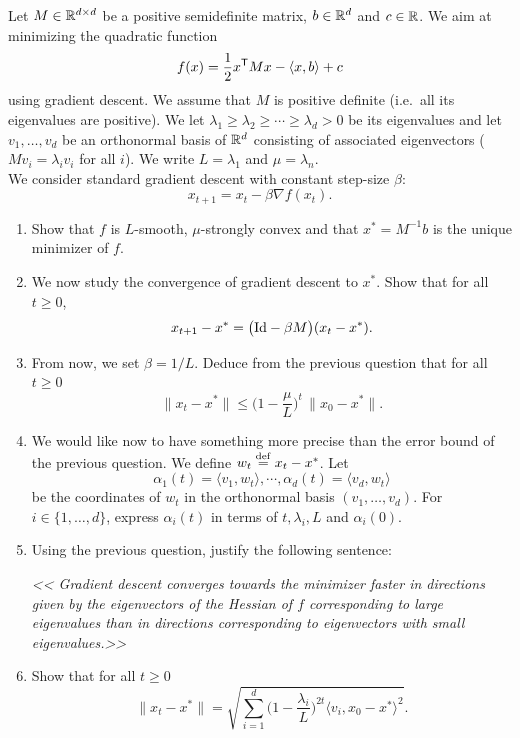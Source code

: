 \documentclass[11pt,nocut]{article}
\begin{document}
\begin{problem}[3 points]\label{p:grad}
	Let $M \in \mathbb{R}^{d \times d}$ be a positive semidefinite matrix, $b \in \mathbb{R}^d$ and $c \in \mathbb{R}$. We aim at minimizing the quadratic function
	$$
	f(x) = \frac{1}{2} x^{{\sf T}} M x - \langle x,b \rangle + c
	$$
	using gradient descent. 
	We assume that $M$ is positive definite (i.e.\ all its eigenvalues are positive).
	We let $\lambda_1 \geq \lambda_2 \geq \cdots \geq \lambda_d >0$ be its eigenvalues and let $v_1, \dots, v_d$ be an orthonormal basis of $\mathbb{R}^d$ consisting of associated eigenvectors ($Mv_i = \lambda_i v_i$ for all $i$).
	We write $L = \lambda_1$ and $\mu = \lambda_n$.
	\\

	We consider standard gradient descent with constant step-size $\beta$:
$$
x_{t+1} = x_t - \beta \nabla f(x_t).
$$
	\begin{enumerate}[label=\normalfont(\textbf{\alph*})]
		\item Show that $f$ is $L$-smooth, $\mu$-strongly convex and that $x^* = M^{-1} b$ is the unique minimizer of $f$.
		\item We now study the convergence of gradient descent to $x^*$. Show that for all $t \geq 0$,
			$$
			x_{t+1} - x^* = \big({{\rm Id}} - \beta M \big)(x_t - x^*).
			$$
		\item From now, we set $\beta = 1/L$. Deduce from the previous question that for all $t \geq 0$
			$$
			\|x_t - x^* \| \leq \Big(1- \frac{\mu}{L}\Big)^{\! t} \, \|x_0 - x^*\|.
			$$
		\item We would like now to have something more precise than the error bound of the previous question. We define $w_t \overset{\rm def}{=} x_t -x^*$. Let 
			$$
			\alpha_1(t) = \langle v_1, w_t \rangle, \cdots, \alpha_d(t) = \langle v_d, w_t \rangle
			$$
			be the coordinates of $w_t$ in the orthonormal basis $(v_1, \dots, v_d)$.
			For $i \in \{1, \dots, d\}$, express $\alpha_i(t)$ in terms of $t,\lambda_i,L$ and $\alpha_i(0)$. 
		\item Using the previous question, justify the following sentence:
			\begin{center}
			\emph{
				<< Gradient descent converges towards the minimizer faster in directions given  by the eigenvectors of the Hessian of $f$ corresponding to large eigenvalues than in directions corresponding to eigenvectors with small eigenvalues.>>
			}
			\end{center}
		\item Show that for all $t \geq 0$
			$$
			\|x_t - x^* \| = \sqrt{\sum_{i=1}^d \Big(1-\frac{\lambda_i}{L}\Big)^{\!2t} \big\langle v_i, x_0-x^* \big\rangle^2}.
			$$
	\end{enumerate}
\end{problem}
\end{document}
